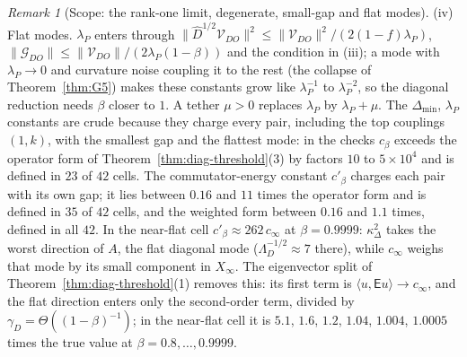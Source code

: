 \documentclass[11pt]{article}
\theoremstyle{remark}
\newtheorem{remark}[theorem]{Remark}
\begin{document}
\begin{remark}[Scope: the rank-one limit, degenerate, small-gap and flat modes]
(iv) Flat modes. $\lambda_P$ enters through $\|\widehat D^{1/2}\mathcal V_{DO}\|^2\le\|\mathcal V_{DO}\|^2/(2(1-f)\lambda_P)$, $\|\mathcal G_{DO}\|\le\|\mathcal V_{DO}\|/(2\lambda_P(1-\beta))$ and the condition in (iii); a mode with $\lambda_P\to0$ and curvature noise coupling it to the rest (the collapse of Theorem~\ref{thm:G5}) makes these constants grow like $\lambda_P^{-1}$ to $\lambda_P^{-2}$, so the diagonal reduction needs $\beta$ closer to $1$. A tether $\mu>0$ replaces $\lambda_P$ by $\lambda_P+\mu$. The $\Delta_{\min}$, $\lambda_P$ constants are crude because they charge every pair, including the top couplings $(1,k)$, with the smallest gap and the flattest mode: in the checks $c_\beta$ exceeds the operator form of Theorem~\ref{thm:diag-threshold}(3) by factors $10$ to $5\times10^4$ and is defined in $23$ of $42$ cells. The commutator-energy constant $c'_\beta$ charges each pair with its own gap; it lies between $0.16$ and $11$ times the operator form and is defined in $35$ of $42$ cells, and the weighted form between $0.16$ and $1.1$ times, defined in all $42$. In the near-flat cell $c'_\beta\approx262\,c_\infty$ at $\beta=0.9999$: $\kappa_\Delta^2$ takes the worst direction of $A$, the flat diagonal mode ($\Lambda_D^{-1/2}\approx7$ there), while $c_\infty$ weighs that mode by its small component in $X_\infty$. The eigenvector split of Theorem~\ref{thm:diag-threshold}(1) removes this: its first term is $\langle u,\mathsf Eu\rangle\to c_\infty$, and the flat direction enters only the second-order term, divided by $\gamma_D=\Theta((1-\beta)^{-1})$; in the near-flat cell it is $5.1$, $1.6$, $1.2$, $1.04$, $1.004$, $1.0005$ times the true value at $\beta=0.8,\dots,0.9999$.
\end{remark}
\end{document}
